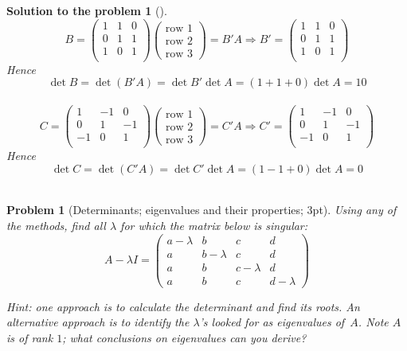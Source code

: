 \documentclass[12pt,a4]{article}
\newtheorem{problem}{Problem}
\newtheorem{solution}{Solution to the problem}
\begin{document}
\begin{solution}[]\rm
\[
B = 
\begin{pmatrix}
1 & 1 & 0 \\
0 & 1 & 1 \\
1 & 0 & 1 \\
\end{pmatrix} \begin{pmatrix}\textrm{row~1} \\  \textrm{row~2} \\  \textrm{row~3}\end{pmatrix} = B'A \Rightarrow
B' = 
\begin{pmatrix}
1 & 1 & 0 \\
0 & 1 & 1 \\
1 & 0 & 1 \\
\end{pmatrix}
\]
Hence
\[
\det B = \det (B'A) = \det B' \det A = (1 + 1 + 0) \det A  = 10
\]\\[1pt]
\[
C = 
\begin{pmatrix}
1 & -1 & 0 \\
0 & 1 & -1 \\
-1 & 0 & 1 \\
\end{pmatrix} \begin{pmatrix}\textrm{row~1} \\  \textrm{row~2} \\  \textrm{row~3}\end{pmatrix} = C'A
\Rightarrow
C' = 
\begin{pmatrix}
1 & -1 & 0 \\
0 & 1 & -1 \\
-1 & 0 & 1 \\
\end{pmatrix}
\]
Hence
\[
\det C = \det (C'A) = \det C' \det A = (1 - 1 + 0) \det A  = 0
\]
\\\end{solution}

\begin{problem}[Determinants; eigenvalues and their properties; 3pt]\rm
	Using any of the methods, find all $\lambda$ for which the matrix below is singular:
	\[
	A - \lambda I = \begin{pmatrix}
	a -\lambda & b & c & d \\  a & b-\lambda & c & d  
	\\ a & b & c-\lambda & d \\ a & b & c & d-\lambda
	\end{pmatrix}
	\]
	
	 \small{\textsf{Hint: one approach is to calculate the determinant and find its roots. An alternative approach is to identify the $\lambda$'s looked for as eigenvalues of~$A$. Note $A$ is of rank $1$; what conclusions on eigenvalues can you derive? }}
\end{problem}
\end{document}
